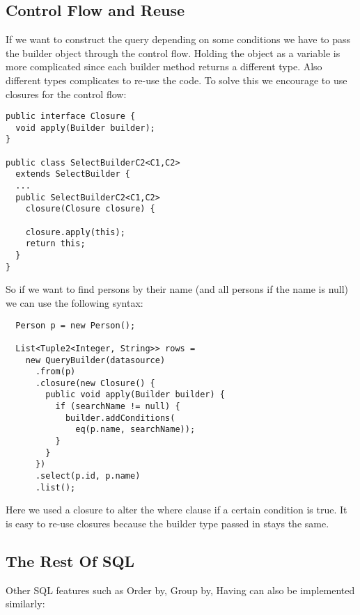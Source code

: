 \documentclass{sig-alternate}
\begin{document}
\subsection{Control Flow and Reuse}

If we want to construct the query depending on some conditions we have to pass the builder object through the control flow. Holding the object as a variable is more complicated since each builder method returns a different type. Also different types complicates to re-use the code. To solve this we encourage to use closures for the control flow:

\begin{verbatim}
public interface Closure {
  void apply(Builder builder);
}

public class SelectBuilderC2<C1,C2> 
  extends SelectBuilder {
  ...
  public SelectBuilderC2<C1,C2> 
    closure(Closure closure) {

    closure.apply(this);
    return this;
  }
}
\end{verbatim}

So if we want to find persons by their name (and all persons if the name is null) we can use the following syntax:

\begin{verbatim}
  Person p = new Person();

  List<Tuple2<Integer, String>> rows =
    new QueryBuilder(datasource)
      .from(p)
      .closure(new Closure() {
        public void apply(Builder builder) {
          if (searchName != null) {
            builder.addConditions(
              eq(p.name, searchName));
          }
        }
      })
      .select(p.id, p.name)
      .list();
\end{verbatim}

Here we used a closure to alter the where clause if a certain condition is true.
It is easy to re-use closures because the builder type passed in stays the same.

\subsection{The Rest Of SQL}

Other SQL features such as Order by, Group by, Having can also be implemented similarly:
\end{document}
